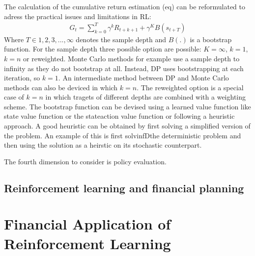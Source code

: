 \documentclass[letterpaper,10pt,english]{jupyterBook}
\begin{document}
\sphinxAtStartPar
The calculation of the cumulative return estimation (eq) can be reformulated to adress the practical issues and limitations in RL:
\begin{equation*}
\begin{split} G_t = \sum_{k=0}^T \gamma^kR_{t+k+1} + \gamma^KB(s_{t+T}) \end{split}
\end{equation*}
\sphinxAtStartPar
Where \(T \in {1,2,3, ..., \infty}\) denotes the sample depth and \(B(.)\) is a bootstrap function. For the sample depth three possible option are possible: \(K = \infty\), \(k = 1\),  \(k = n\) or reweighted. Monte Carlo methods for example use a sample depth to infinity as they do not bootstrap at all. Instead, DP uses bootstrapping at each iteration, so \(k = 1\). An intermediate method between DP and Monte Carlo methods can also be deviced in which \( k = n\). The reweighted option is a special case of \( k = n\) in which tragets of different depths are combined with a weighting scheme. The bootstrap function can be devised using a learned value function like state value function or the state\sphinxhyphen{}action value function or following a heuristic approach. A good heuristic can be obtained by first solving a simplified version of the problem. An example of this is first solvinfDthe deterministic problem and then using the solution as a heirstic on its stochastic counterpart.

\sphinxAtStartPar
The fourth dimension to consider is policy evaluation.


\subsection{Reinforcement learning and financial planning}
\label{\detokenize{Reinforcement_learning:reinforcement-learning-and-financial-planning}}

\section{Financial Application of Reinforcement Learning}
\label{\detokenize{Financial_application:financial-application-of-reinforcement-learning}}\label{\detokenize{Financial_application::doc}}
\end{document}
